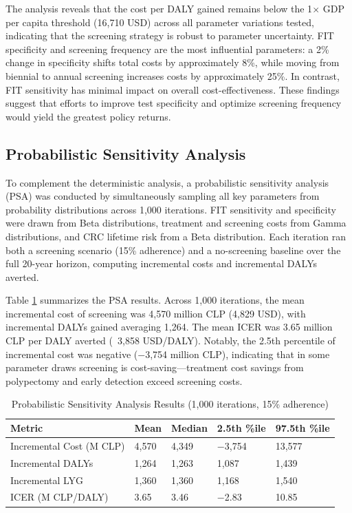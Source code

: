 \documentclass[sn-mathphys-num]{sn-jnl}%
\theoremstyle{thmstyleone}%
\theoremstyle{thmstyletwo}%
\theoremstyle{thmstylethree}%
\begin{document}
The analysis reveals that the cost per DALY gained remains below the 1$\times$ GDP per capita threshold (16,710 USD) across all parameter variations tested, indicating that the screening strategy is robust to parameter uncertainty. FIT specificity and screening frequency are the most influential parameters: a 2\% change in specificity shifts total costs by approximately 8\%, while moving from biennial to annual screening increases costs by approximately 25\%. In contrast, FIT sensitivity has minimal impact on overall cost-effectiveness. These findings suggest that efforts to improve test specificity and optimize screening frequency would yield the greatest policy returns.

\subsection{Probabilistic Sensitivity Analysis}

To complement the deterministic analysis, a probabilistic sensitivity analysis (PSA) was conducted by simultaneously sampling all key parameters from probability distributions across 1,000 iterations. FIT sensitivity and specificity were drawn from Beta distributions, treatment and screening costs from Gamma distributions, and CRC lifetime risk from a Beta distribution. Each iteration ran both a screening scenario (15\% adherence) and a no-screening baseline over the full 20-year horizon, computing incremental costs and incremental DALYs averted.

Table \ref{table:psa_results} summarizes the PSA results. Across 1,000 iterations, the mean incremental cost of screening was 4,570 million CLP (4,829 USD), with incremental DALYs gained averaging 1,264. The mean ICER was 3.65 million CLP per DALY averted (~3,858 USD/DALY). Notably, the 2.5th percentile of incremental cost was negative ($-$3,754 million CLP), indicating that in some parameter draws screening is cost-saving---treatment cost savings from polypectomy and early detection exceed screening costs.

\begin{table}[H]
\centering
\begin{tabularx}{\textwidth}{|X|X|X|X|X|}
\hline
\textbf{Metric} & \textbf{Mean} & \textbf{Median} & \textbf{2.5th \%ile} & \textbf{97.5th \%ile} \\ \hline
Incremental Cost (M CLP) & 4,570 & 4,349 & $-$3,754 & 13,577 \\ \hline
Incremental DALYs & 1,264 & 1,263 & 1,087 & 1,439 \\ \hline
Incremental LYG & 1,360 & 1,360 & 1,168 & 1,540 \\ \hline
ICER (M CLP/DALY) & 3.65 & 3.46 & $-$2.83 & 10.85 \\ \hline
\end{tabularx}
\caption{Probabilistic Sensitivity Analysis Results (1,000 iterations, 15\% adherence)}
\label{table:psa_results}
\end{table}
\end{document}
